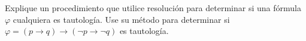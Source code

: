 Explique un procedimiento que utilice resolución para determinar si una fórmula $\varphi$ cualquiera es tautología. Use su método para determinar si
$\varphi=(p\rightarrow q)\rightarrow(\neg p\rightarrow\neg q)$
es tautología.